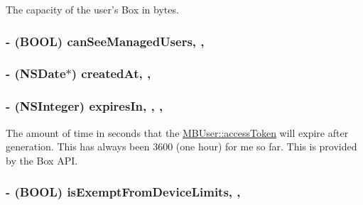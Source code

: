 The capacity of the user's Box in bytes. 

\hypertarget{interface_m_b_user_aa9d85e54ce8ba89ab2ce480d31821553}{
\subsubsection[{can\-See\-Managed\-Users}]{\setlength{\rightskip}{0pt plus 5cm}-\/ (B\-O\-O\-L) can\-See\-Managed\-Users\hspace{0.3cm}{\ttfamily [read]}, {\ttfamily [nonatomic]}, {\ttfamily [assign]}}}\label{interface_m_b_user_aa9d85e54ce8ba89ab2ce480d31821553}
\hypertarget{interface_m_b_user_a14b222dd776fc02c65470ce74c8cf1e1}{
\subsubsection[{created\-At}]{\setlength{\rightskip}{0pt plus 5cm}-\/ (N\-S\-Date$\ast$) created\-At\hspace{0.3cm}{\ttfamily [read]}, {\ttfamily [nonatomic]}, {\ttfamily [strong]}}}\label{interface_m_b_user_a14b222dd776fc02c65470ce74c8cf1e1}
\hypertarget{interface_m_b_user_ae251d07feaa95423629811e829c40f0a}{
\subsubsection[{expires\-In}]{\setlength{\rightskip}{0pt plus 5cm}-\/ (N\-S\-Integer) expires\-In\hspace{0.3cm}{\ttfamily [read]}, {\ttfamily [write]}, {\ttfamily [nonatomic]}, {\ttfamily [assign]}}}\label{interface_m_b_user_ae251d07feaa95423629811e829c40f0a}
The amount of time in seconds that the \hyperlink{interface_m_b_user_aae7d6df5c0e6da13e80b3ddb82ae7081}{M\-B\-User\-::access\-Token} will expire after generation. This has always been 3600 (one hour) for me so far. This is provided by the Box A\-P\-I. \hypertarget{interface_m_b_user_a2596dea4aeaeb87b1d3d872c54e63f1a}{
\subsubsection[{is\-Exempt\-From\-Device\-Limits}]{\setlength{\rightskip}{0pt plus 5cm}-\/ (B\-O\-O\-L) is\-Exempt\-From\-Device\-Limits\hspace{0.3cm}{\ttfamily [read]}, {\ttfamily [nonatomic]}, {\ttfamily [assign]}}}\label{interface_m_b_user_a2596dea4aeaeb87b1d3d872c54e63f1a}
